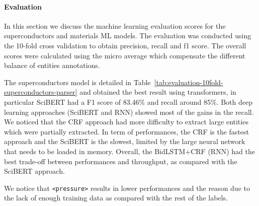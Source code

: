 \documentclass{article}
\begin{document}
\paragraph{Evaluation}

In this section we discuss the machine learning evaluation scores for the superconductors and materials ML models. The evaluation was conducted using the 10-fold cross validation to obtain precision, recall and f1 score. The overall scores were calculated using the micro average which compensate the different balance of entities annotations. 

The superconductors model is detailed in Table~\ref{tab:evaluation-10fold-superconductors-parser} and obtained the best result using transformers, in particular SciBERT had a F1 score of 83.46\% and recall around 85\%. Both deep learning approaches (SciBERT and RNN) showed most of the gains in the recall.
We noticed that the CRF approach had more difficulty to extract large entities which were partially extracted. 
In term of performances, the CRF is the fastest approach and the SciBERT is the slowest, limited by the large neural network that needs to be loaded in memory.
Overall, the BidLSTM+CRF (RNN) had the best trade-off between performances and throughput, as compared with the SciBERT approach. 

We notice that \texttt{<pressure>} results in lower performances and the reason due to the lack of enough training data as compared with the rest of the labels. 
\end{document}
